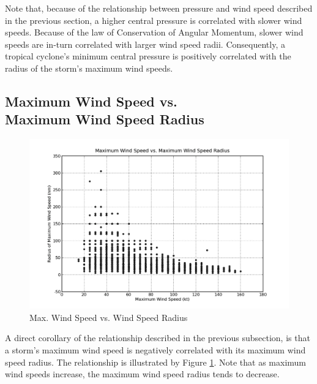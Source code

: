 \documentclass[letterpaper,twocolumn,10pt]{article}
\begin{document}
Note that, because of the relationship between pressure and wind speed described
in the previous section, a higher central pressure is correlated with slower
wind speeds. Because of the law of Conservation of Angular Momentum, slower wind
speeds are in-turn correlated with larger wind speed radii. Consequently, a
tropical cyclone's minimum central pressure is positively correlated with the
radius of the storm's maximum wind speeds.


\subsection{Maximum Wind Speed vs.\\Maximum Wind Speed Radius}
\begin{figure}[h!]
  \centering
  \includegraphics[scale=0.31]{speed_vs_radius.png}
  \caption{Max. Wind Speed vs. Wind Speed Radius}
  \label{speed_vs_radius}
\end{figure}
A direct corollary of the relationship described in the previous subsection, is
that a storm's maximum wind speed is negatively correlated with its maximum wind
speed radius. The relationship is illustrated by Figure \ref{speed_vs_radius}.
Note that as maximum wind speeds increase, the maximum wind speed radius tends
to decrease.
\end{document}

